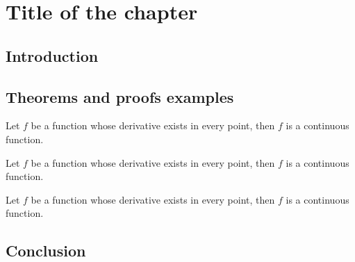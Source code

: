 \chapter{Title of the chapter}

\section{Introduction}
\section{Theorems and proofs examples}
\begin{theorem}
	Let \(f\) be a function whose derivative exists in every point, then \(f\) 
	is a continuous function.
\end{theorem}
\begin{definition}
	Let \(f\) be a function whose derivative exists in every point, then \(f\) 
	is a continuous function.
\end{definition}
\begin{remark}
	Let \(f\) be a function whose derivative exists in every point, then \(f\) 
	is a continuous function.
\end{remark}


\section{Conclusion}